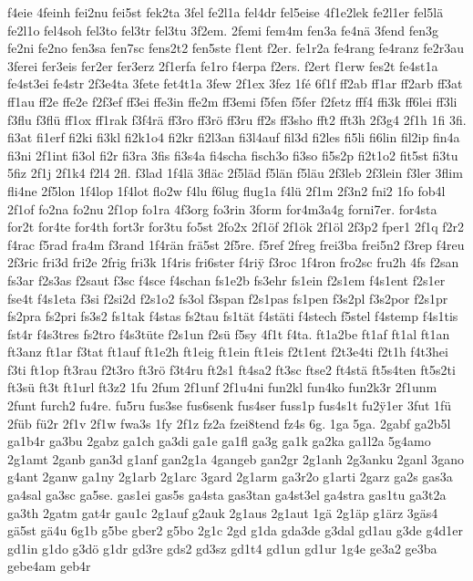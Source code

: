 {f4eie
4feinh
fei2nu
fei5st
fek2ta
3fel
fe2l1a
fel4dr
fel5eise
4f1e2lek
fe2l1er
fel5lä
fe2l1o
fel4soh
fel3to
fel3tr
fel3tu
3f2em.
2femi
fem4m
fen3a
fe4nä
3fend
fen3g
fe2ni
fe2no
fen3sa
fen7sc
fens2t2
fen5ste
f1ent
f2er.
fe1r2a
fe4rang
fe4ranz
fe2r3au
3ferei
fer3eis
fer2er
fer3erz
2f1erfa
fe1ro
f4erpa
f2ers.
f2ert
f1erw
fes2t
fe4st1a
fe4st3ei
fe4str
2f3e4ta
3fete
fet4t1a
3few
2f1ex
3fez
1fé
6f1f
ff2ab
ff1ar
ff2arb
ff3at
ff1au
ff2e
ffe2e
f2f3ef
ff3ei
ffe3in
ffe2m
ff3emi
f5fen
f5fer
f2fetz
fff4
ffi3k
ff6lei
ff3li
f3flu
f3flü
ff1ox
ff1rak
f3f4rä
ff3ro
ff3rö
ff3ru
ff2s
ff3sho
fft2
fft3h
2f3g4
2f1h
1fi
3fi.
fi3at
fi1erf
fi2ki
fi3kl
fi2k1o4
fi2kr
fi2l3an
fi3l4auf
fil3d
fi2les
fi5li
fi6lin
fil2ip
fin4a
fi3ni
2f1int
fi3ol
fi2r
fi3ra
3fis
fi3s4a
fi4scha
fisch3o
fi3so
fi5s2p
fi2t1o2
fit5st
fi3tu
5fiz
2f1j
2f1k4
f2l4
2fl.
f3lad
1f4lä
3fläc
2f5läd
f5län
f5läu
2f3leb
2f3lein
f3ler
3flim
fli4ne
2f5lon
1f4lop
1f4lot
flo2w
f4lu
f6lug
flug1a
f4lü
2f1m
2f3n2
fni2
1fo
fob4l
2f1of
fo2na
fo2nu
2f1op
fo1ra
4f3org
fo3rin
3form
for4m3a4g
forni7er.
for4sta
for2t
for4te
for4th
fort3r
for3tu
fo5st
2fo2x
2f1öf
2f1ök
2f1öl
2f3p2
fper1
2f1q
f2r2
f4rac
f5rad
fra4m
f3rand
1f4rän
frä5st
2f5re.
f5ref
2freg
frei3ba
frei5n2
f3rep
f4reu
2f3ric
fri3d
fri2e
2frig
fri3k
1f4ris
fri6ster
f4ri^^ff
f3roc
1f4ron
fro2sc
fru2h
4fs
f2san
fs3ar
f2s3as
f2saut
f3sc
f4sce
f4schan
fs1e2b
fs3ehr
fs1ein
f2s1em
f4s1ent
f2s1er
fse4t
f4s1eta
f3si
f2si2d
f2s1o2
fs3ol
f3span
f2s1pas
fs1pen
f3s2pl
f3s2por
f2s1pr
fs2pra
fs2pri
fs3s2
fs1tak
f4stas
fs2tau
fs1tät
f4stäti
f4stech
f5stel
f4stemp
f4s1tis
fst4r
f4s3tres
fs2tro
f4s3tüte
f2s1un
f2sü
f5sy
4f1t
f4ta.
ft1a2be
ft1af
ft1al
ft1an
ft3anz
ft1ar
f3tat
ft1auf
ft1e2h
ft1eig
ft1ein
ft1eis
f2t1ent
f2t3e4ti
f2t1h
f4t3hei
f3ti
ft1op
ft3rau
f2t3ro
ft3rö
f3t4ru
ft2s1
ft4sa2
ft3sc
ftse2
ft4stä
ft5s4ten
ft5s2ti
ft3sü
ft3t
ft1url
ft3z2
1fu
2fum
2f1unf
2f1u4ni
fun2kl
fun4ko
fun2k3r
2f1unm
2funt
furch2
fu4re.
fu5ru
fus3se
fus6senk
fus4ser
fuss1p
fus4s1t
fu2^^ff1er
3fut
1fü
2füb
fü2r
2f1v
2f1w
fwa3s
1fy
2f1z
fz2a
fzei8tend
fz4s
6g.
1ga
5ga.
2gabf
ga2b5l
ga1b4r
ga3bu
2gabz
ga1ch
ga3di
ga1e
ga1fl
ga3g
ga1k
ga2ka
ga1l2a
5g4amo
2g1amt
2ganb
gan3d
g1anf
gan2g1a
4gangeb
gan2gr
2g1anh
2g3anku
2ganl
3gano
g4ant
2ganw
ga1ny
2g1arb
2g1arc
3gard
2g1arm
ga3r2o
g1arti
2garz
ga2s
gas3a
ga4sal
ga3sc
ga5se.
gas1ei
gas5s
ga4sta
gas3tan
ga4st3el
ga4stra
gas1tu
ga3t2a
ga3th
2gatm
gat4r
gau1c
2g1auf
g2auk
2g1aus
2g1aut
1gä
2g1äp
g1ärz
3gäs4
gä5st
gä4u
6g1b
g5be
gber2
g5bo
2g1c
2gd
g1da
gda3de
g3dal
gd1au
g3de
g4d1er
gd1in
g1do
g3dö
g1dr
gd3re
gds2
gd3sz
gd1t4
gd1un
gd1ur
1g4e
ge3a2
ge3ba
gebe4am
geb4r
}

